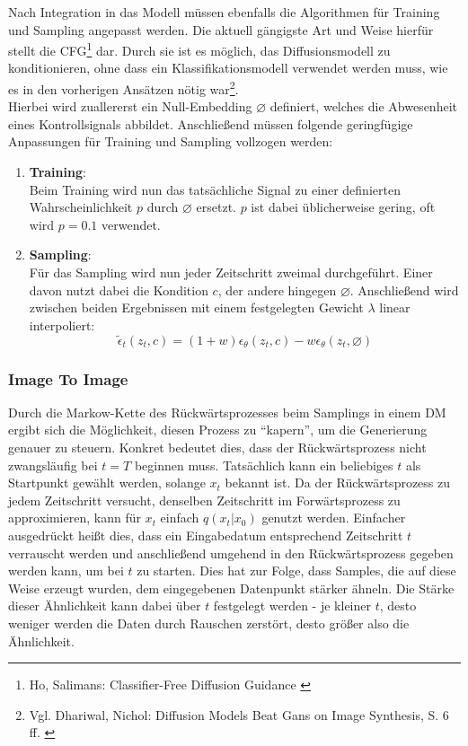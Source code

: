 Nach Integration in das Modell müssen ebenfalls die Algorithmen für Training und Sampling angepasst werden. Die aktuell gängigste Art und Weise hierfür stellt die \ac{CFG}\footnote{
    Ho, Salimans: Classifier-Free Diffusion Guidance
    \cite{ho2022classifierfreediffusionguidance}
} dar. Durch sie ist es möglich, das Diffusionsmodell zu konditionieren, ohne dass ein Klassifikationsmodell verwendet werden muss, wie es in den vorherigen Ansätzen nötig war\footnote{
    Vgl. Dhariwal, Nichol: Diffusion Models Beat Gans on Image Synthesis, S. 6 ff.
    \cite{NEURIPS2021_49ad23d1}
}. \\
Hierbei wird zuallererst ein Null-Embedding $\diameter$ definiert, welches die Abwesenheit eines Kontrollsignals abbildet. Anschließend müssen folgende geringfügige Anpassungen für Training und Sampling vollzogen werden:
\begin{enumerate}
    \item \textbf{Training}:\\
    Beim Training wird nun das tatsächliche Signal zu einer definierten Wahrscheinlichkeit $p$ durch $\diameter$ ersetzt. $p$ ist dabei üblicherweise gering, oft wird $p=0.1$ verwendet.
    \item \textbf{Sampling}:\\
    Für das Sampling wird nun jeder Zeitschritt zweimal durchgeführt. Einer davon nutzt dabei die Kondition $c$, der andere hingegen $\diameter$. Anschließend wird zwischen beiden Ergebnissen mit einem festgelegten Gewicht $\lambda$ linear interpoliert:
    \begin{equation}
        \tilde \epsilon_t(z_t, c) = (1+w)\epsilon_\theta(z_t, c)
        - w\epsilon_\theta(z_t, \diameter)
    \end{equation}
\end{enumerate}

\subsubsection{Image To Image}
\label{subsubsec:i2i}

Durch die Markow-Kette des Rückwärtsprozesses beim Samplings in einem \ac{DM} ergibt sich die Möglichkeit, diesen Prozess zu \enquote{kapern}, um die Generierung genauer zu steuern. Konkret bedeutet dies, dass der Rückwärtsprozess nicht zwangsläufig bei $t=T$ beginnen muss. Tatsächlich kann ein beliebiges $t$ als Startpunkt gewählt werden, solange $x_t$ bekannt ist. Da der Rückwärtsprozess zu jedem Zeitschritt versucht, denselben Zeitschritt im Forwärtsprozess zu approximieren, kann für $x_t$ einfach $q(x_t|x_0)$ genutzt werden. Einfacher ausgedrückt heißt dies, dass ein Eingabedatum entsprechend Zeitschritt $t$ verrauscht werden und anschließend umgehend in den Rückwärtsprozess gegeben werden kann, um bei $t$ zu starten. Dies hat zur Folge, dass Samples, die auf diese Weise erzeugt wurden, dem eingegebenen Datenpunkt stärker ähneln. Die Stärke dieser Ähnlichkeit kann dabei über $t$ festgelegt werden - je kleiner $t$, desto weniger werden die Daten durch Rauschen zerstört, desto größer also die Ähnlichkeit.


